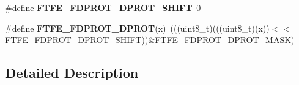 \begin{DoxyCompactItemize}
\item 
\#define {\bfseries F\+T\+F\+E\+\_\+\+F\+D\+P\+R\+O\+T\+\_\+\+D\+P\+R\+O\+T\+\_\+\+S\+H\+I\+FT}~0\hypertarget{group__FTFE__Register__Masks_gaa0430b877bb9f714aa8192ac4eb3980f}{}\label{group__FTFE__Register__Masks_gaa0430b877bb9f714aa8192ac4eb3980f}

\item 
\#define {\bfseries F\+T\+F\+E\+\_\+\+F\+D\+P\+R\+O\+T\+\_\+\+D\+P\+R\+OT}(x)~(((uint8\+\_\+t)(((uint8\+\_\+t)(x))$<$$<$F\+T\+F\+E\+\_\+\+F\+D\+P\+R\+O\+T\+\_\+\+D\+P\+R\+O\+T\+\_\+\+S\+H\+I\+FT))\&F\+T\+F\+E\+\_\+\+F\+D\+P\+R\+O\+T\+\_\+\+D\+P\+R\+O\+T\+\_\+\+M\+A\+SK)\hypertarget{group__FTFE__Register__Masks_gaedb8c0b9187a153561329cd7a797a27c}{}\label{group__FTFE__Register__Masks_gaedb8c0b9187a153561329cd7a797a27c}

\end{DoxyCompactItemize}


\subsection{Detailed Description}
